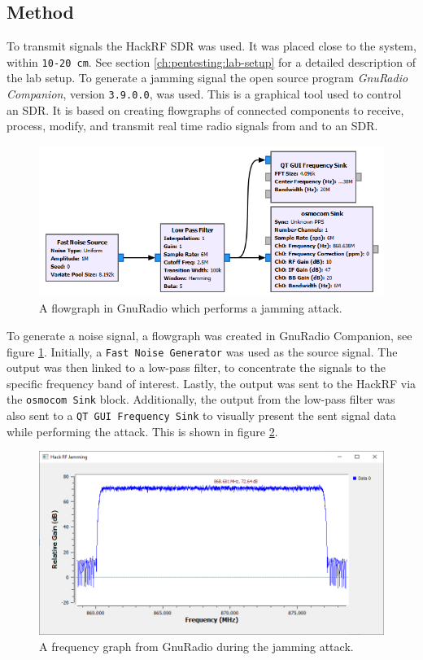 \subsection{Method}
To transmit signals the HackRF SDR was used. It was placed close to the system, within \texttt{10-20 cm}. See section \ref{ch:pentesting:lab-setup} for a detailed description of the lab setup. To generate a jamming signal the open source program \textit{GnuRadio Companion}, version \texttt{3.9.0.0}, was used. This is a graphical tool used to control an SDR. It is based on creating flowgraphs of connected components to receive, process, modify, and transmit real time radio signals from and to an SDR.
\begin{figure}[!ht]
    \centering
    \includegraphics[width=\textwidth]{images/6-pentesting/jamming-flowgraph.png}
    \caption{A flowgraph in GnuRadio which performs a jamming attack.}
    \label{fig:gnuradio-jamming-flowgraph}
\end{figure}
To generate a noise signal, a flowgraph was created in GnuRadio Companion, see figure \ref{fig:gnuradio-jamming-flowgraph}. Initially, a \texttt{Fast Noise Generator} was used as the source signal. The output was then linked to a low-pass filter, to concentrate the signals to the specific frequency band of interest. Lastly, the output was sent to the HackRF via the \texttt{osmocom Sink} block. Additionally, the output from the low-pass filter was also sent to a \texttt{QT GUI Frequency Sink} to visually present the sent signal data while performing the attack. This is shown in figure \ref{fig:gnuradio-frequency-graph}.
\begin{figure}[!ht]
    \centering
    \includegraphics[width=\textwidth]{images/6-pentesting/jamming-output-graph.png}
    \caption{A frequency graph from GnuRadio during the jamming attack.}
    \label{fig:gnuradio-frequency-graph}
\end{figure}

